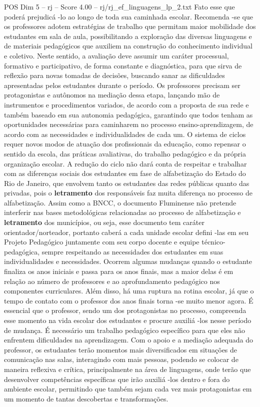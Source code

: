 \begin{textsample}{POS Dim 5 – rj – Score 4.00 – rj/rj\_ef\_linguagens\_lp\_2.txt}
Fato esse que poderá prejudicá -lo ao longo de toda sua caminhada escolar.
Recomenda -se que os professores adotem estratégias de trabalho que permitam maior mobilidade dos estudantes em sala de aula, possibilitando a exploração das diversas linguagens e de materiais pedagógicos que auxiliem na construção do conhecimento individual e coletivo.
Neste sentido, a avaliação deve assumir um caráter processual, formativo e participativo, de forma constante e diagnóstica, para que sirva de reflexão para novas tomadas de decisões, buscando sanar as dificuldades apresentadas pelos estudantes durante o período.
Os professores precisam ser protagonistas e autônomos na mediação dessa etapa, lançando mão de instrumentos e procedimentos variados, de acordo com a proposta de sua rede e também baseado em sua autonomia pedagógica, garantindo que todos tenham as oportunidades necessárias para caminharem no processo ensino-aprendizagem, de acordo com as necessidades e individualidades de cada um.
O sistema de ciclos requer novos modos de atuação dos profissionais da educação, como repensar o sentido da escola, das práticas avaliativas, do trabalho pedagógico e da própria organização escolar.
A redução do ciclo não dará conta de respeitar e trabalhar com as diferenças sociais dos estudantes em fase de alfabetização do Estado do Rio de Janeiro, que envolvem tanto os estudantes das redes públicas quanto das privadas, pois o \textbf{letramento} dos responsáveis faz muita diferença no processo de alfabetização.
Assim como a BNCC, o documento Fluminense não pretende interferir nas bases metodológicas relacionadas ao processo de alfabetização e \textbf{letramento} dos municípios, ou seja, esse documento tem caráter orientador/norteador, portanto caberá a cada unidade escolar defini -las em seu Projeto Pedagógico juntamente com seu corpo docente e equipe técnico-pedagógica, sempre respeitando as necessidades dos estudantes em suas individualidades e necessidades.
Ocorrem algumas mudanças quando o estudante finaliza os anos iniciais e passa para os anos finais, mas a maior delas é em relação ao número de professores e ao aprofundamento pedagógico nos componentes curriculares.
Além disso, há uma ruptura na rotina escolar, já que o tempo de contato com o professor dos anos finais torna -se muito menor agora.
É essencial que o professor, sendo um dos protagonistas no processo, compreenda esse momento na vida escolar dos estudantes e procure auxiliá -los nesse período de mudança.
É necessário um trabalho pedagógico específico para que eles não enfrentem dificuldades na aprendizagem.
Com o apoio e a mediação adequada do professor, os estudantes terão momentos mais diversificados em situações de comunicação nas salas, interagindo com mais pessoas, podendo se colocar de maneira reflexiva e crítica, principalmente na área de linguagens, onde terão que desenvolver competências específicas que irão auxiliá -los dentro e fora do ambiente escolar, permitindo que também sejam cada vez mais protagonistas em um momento de tantas descobertas e transformações.

\end{textsample}
